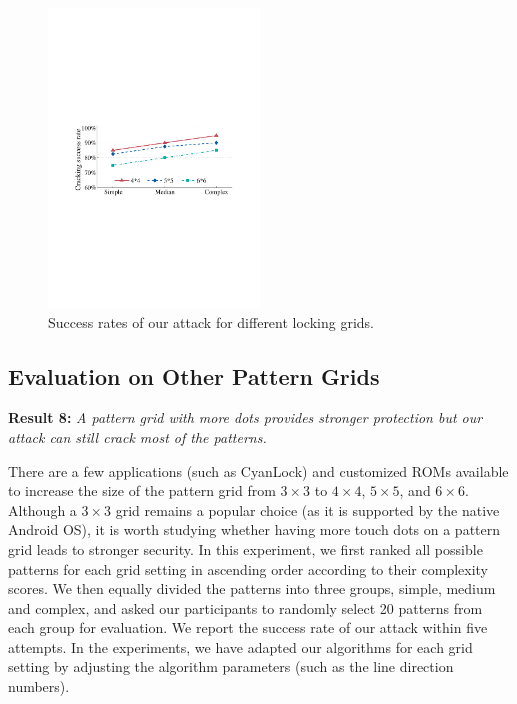         \begin{figure}[!t]
            \centering
            \includegraphics[width=0.5\textwidth]{fig/scalability.pdf}
            \caption{Success rates of our attack for different locking grids.}
            \label{fig:scalability}
        \end{figure}

    \subsection{Evaluation on Other Pattern Grids\label{sec:scalability}}
    \noindent \textbf{Result 8:} \emph{A pattern grid with more dots provides stronger protection but our attack can still crack most of the patterns.}

        There are a few applications (such as CyanLock) and customized ROMs available to increase the size of the pattern grid from $3\times3$ to $4\times4$, $5\times5$, and $6\times6$.
        Although a $3 \times 3$ grid remains
        a popular choice (as it is supported by the native Android OS), it is worth studying whether
        having more touch dots on a pattern grid leads to stronger security. In this
        experiment, we first ranked all possible patterns for each grid setting in
        ascending order according to their complexity scores. We then equally
        divided the patterns into three groups, simple, medium and complex,
        and asked our participants to randomly select 20 patterns from each group for evaluation. We
        report the success rate of our attack within five attempts. In the experiments, we have adapted our algorithms for each grid setting
        by adjusting the algorithm parameters (such as the line direction numbers).


